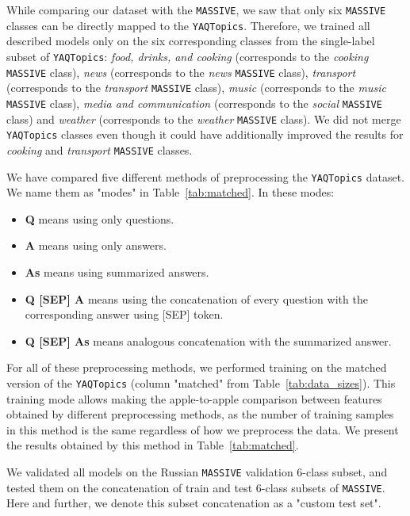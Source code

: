 While comparing our dataset with the \texttt{MASSIVE}, we saw that only six \texttt{MASSIVE} classes can be directly mapped to the \texttt{YAQTopics}. Therefore, we trained all described models only on the six corresponding classes from the single-label subset of \texttt{YAQTopics}: \textit{food, drinks, and cooking}  (corresponds to the \textit{cooking} \texttt{MASSIVE} class), \textit{news} (corresponds to the \textit{news} \texttt{MASSIVE} class), \textit{transport} (corresponds to the \textit{transport} \texttt{MASSIVE} class), \textit{music} (corresponds to the \textit{music} \texttt{MASSIVE} class), \textit{media and communication} (corresponds to the \textit{social} \texttt{MASSIVE} class) and \textit{weather} (corresponds to the \textit{weather} \texttt{MASSIVE} class). We did not merge \texttt{YAQTopics} classes even though it could have additionally improved the results for \textit{cooking} and \textit{transport} \texttt{MASSIVE} classes.

We have compared five different methods of preprocessing the \texttt{YAQTopics} dataset. We name them as "modes" in Table~\ref{tab:matched}. In these modes:
\begin{itemize}
    \item \textbf{Q} means using only questions.
    \item \textbf{A} means using only answers.
    \item \textbf{As} means using summarized answers.
    \item \textbf{Q [SEP] A} means using the concatenation of every question with the corresponding answer using [SEP] token.
    \item \textbf{Q [SEP] As} means analogous concatenation with the summarized answer. 
\end{itemize}

For all of these preprocessing methods, we performed training on the matched version of the \texttt{YAQTopics} (column "matched" from Table~\ref{tab:data_sizes}). This training mode allows making the apple-to-apple comparison between features obtained by different preprocessing methods, as the number of training samples in this method is the same regardless of how we preprocess the data. We present the results obtained by this method in Table~\ref{tab:matched}.


We validated all models on the Russian \texttt{MASSIVE} validation 6-class subset, and tested them on the concatenation of train and test 6-class subsets of \texttt{MASSIVE}. Here and further, we denote this subset concatenation as a "custom test set".

